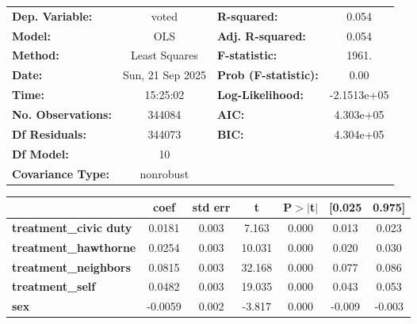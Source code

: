\begin{center}
\begin{tabular}{lclc}
\toprule
\textbf{Dep. Variable:}        &      voted       & \textbf{  R-squared:         } &      0.054   \\
\textbf{Model:}                &       OLS        & \textbf{  Adj. R-squared:    } &      0.054   \\
\textbf{Method:}               &  Least Squares   & \textbf{  F-statistic:       } &      1961.   \\
\textbf{Date:}                 & Sun, 21 Sep 2025 & \textbf{  Prob (F-statistic):} &      0.00    \\
\textbf{Time:}                 &     15:25:02     & \textbf{  Log-Likelihood:    } & -2.1513e+05  \\
\textbf{No. Observations:}     &      344084      & \textbf{  AIC:               } &  4.303e+05   \\
\textbf{Df Residuals:}         &      344073      & \textbf{  BIC:               } &  4.304e+05   \\
\textbf{Df Model:}             &          10      & \textbf{                     } &              \\
\textbf{Covariance Type:}      &    nonrobust     & \textbf{                     } &              \\
\bottomrule
\end{tabular}
\begin{tabular}{lcccccc}
                               & \textbf{coef} & \textbf{std err} & \textbf{t} & \textbf{P$> |$t$|$} & \textbf{[0.025} & \textbf{0.975]}  \\
\midrule
\textbf{treatment\_civic duty} &       0.0181  &        0.003     &     7.163  &         0.000        &        0.013    &        0.023     \\
\textbf{treatment\_hawthorne}  &       0.0254  &        0.003     &    10.031  &         0.000        &        0.020    &        0.030     \\
\textbf{treatment\_neighbors}  &       0.0815  &        0.003     &    32.168  &         0.000        &        0.077    &        0.086     \\
\textbf{treatment\_self}       &       0.0482  &        0.003     &    19.035  &         0.000        &        0.043    &        0.053     \\
\textbf{sex}                   &      -0.0059  &        0.002     &    -3.817  &         0.000        &       -0.009    &       -0.003     \\

\end{tabular}
\end{center}
